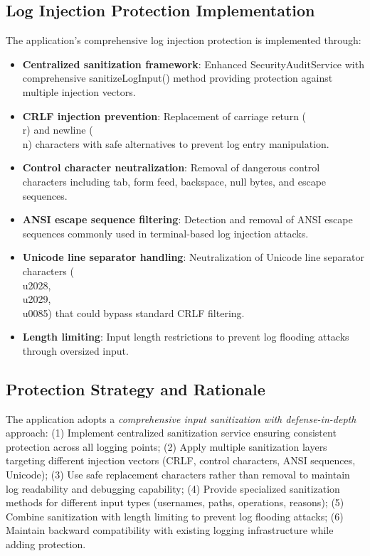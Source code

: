 \documentclass[]{UCD_CS_FYP_Report}
\begin{document}
\subsection{Log Injection Protection Implementation}
The application's comprehensive log injection protection is implemented through:
\begin{itemize}
	\item \textbf{Centralized sanitization framework}: Enhanced SecurityAuditService with comprehensive sanitizeLogInput() method providing protection against multiple injection vectors.
	\item \textbf{CRLF injection prevention}: Replacement of carriage return (\\r) and newline (\\n) characters with safe alternatives to prevent log entry manipulation.
	\item \textbf{Control character neutralization}: Removal of dangerous control characters including tab, form feed, backspace, null bytes, and escape sequences.
	\item \textbf{ANSI escape sequence filtering}: Detection and removal of ANSI escape sequences commonly used in terminal-based log injection attacks.
	\item \textbf{Unicode line separator handling}: Neutralization of Unicode line separator characters (\\u2028, \\u2029, \\u0085) that could bypass standard CRLF filtering.
	\item \textbf{Length limiting}: Input length restrictions to prevent log flooding attacks through oversized input.
\end{itemize}

\subsection{Protection Strategy and Rationale}
The application adopts a \textit{comprehensive input sanitization with defense-in-depth} approach: (1) Implement centralized sanitization service ensuring consistent protection across all logging points; (2) Apply multiple sanitization layers targeting different injection vectors (CRLF, control characters, ANSI sequences, Unicode); (3) Use safe replacement characters rather than removal to maintain log readability and debugging capability; (4) Provide specialized sanitization methods for different input types (usernames, paths, operations, reasons); (5) Combine sanitization with length limiting to prevent log flooding attacks; (6) Maintain backward compatibility with existing logging infrastructure while adding protection.
\end{document}
